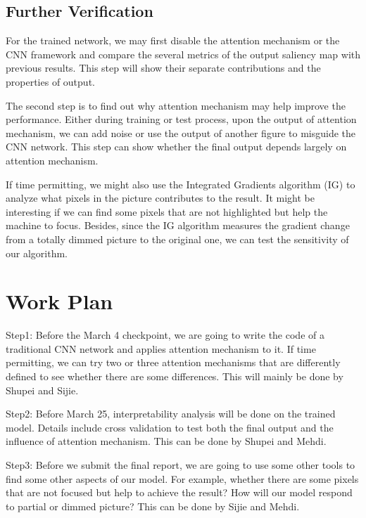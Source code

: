 \documentclass[12pt]{article}
\begin{document}
\subsection{Further Verification}

For the trained network, we may first disable the attention mechanism or the CNN framework and compare the several metrics of the output saliency map with previous results. 
This step will show their separate contributions and the properties of output.

The second step is to find out why attention mechanism may help improve the performance. 
Either during training or test process, upon the output of attention mechanism, we can add noise or use the output of another figure to misguide the CNN network. 
This step can show whether the final output depends largely on attention mechanism.

If time permitting, we might also use the Integrated Gradients algorithm (IG) \cite{sundararajan2017axiomatic} to analyze what pixels in the picture contributes to the result. 
It might be interesting if we can find some pixels that are not highlighted but help the machine to focus. 
Besides, since the IG algorithm measures the gradient change from a totally dimmed picture to the original one, we can test the sensitivity of our algorithm.

\section{Work Plan}

Step1: Before the March 4 checkpoint, we are going to write the code of a traditional CNN network and applies attention mechanism to it. 
If time permitting, we can try two or three attention mechanisms that are differently defined to see whether there are some differences. 
This will mainly be done by Shupei and Sijie.

Step2: Before March 25, interpretability analysis will be done on the trained model. Details include cross validation to test both the final output and the influence of attention mechanism. 
This can be done by Shupei and Mehdi.

Step3: Before we submit the final report, we are going to use some other tools to find some other aspects of our model. 
For example, whether there are some pixels that are not focused but help to achieve the result? How will our model respond to partial or dimmed picture? This can be done by Sijie and Mehdi.

\newpage



\end{document}
